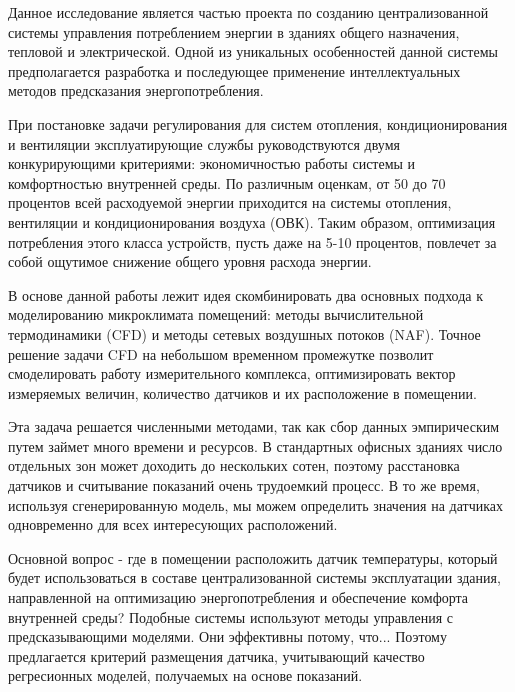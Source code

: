 
Данное исследование является частью проекта по созданию централизованной системы управления потреблением энергии в зданиях общего назначения, тепловой и электрической. Одной из уникальных особенностей данной системы предполагается разработка и последующее применение интеллектуальных методов предсказания энергопотребления.

При постановке задачи регулирования для систем отопления, кондиционирования и вентиляции эксплуатирующие службы руководствуются двумя конкурирующими критериями: экономичностью работы системы и комфортностью внутренней среды. По различным оценкам, от 50 до 70 процентов всей расходуемой энергии приходится на системы отопления, вентиляции и кондиционирования воздуха (ОВК). Таким образом, оптимизация потребления этого класса устройств, пусть даже на 5-10 процентов, повлечет за собой ощутимое снижение общего уровня расхода энергии. 

В основе данной работы лежит идея скомбинировать два основных подхода к моделированию микроклимата помещений: методы вычислительной термодинамики (CFD) и методы сетевых воздушных потоков (NAF). Точное решение задачи CFD на небольшом временном промежутке позволит смоделировать работу измерительного комплекса, оптимизировать вектор измеряемых величин, количество датчиков и их расположение в помещении. 

Эта задача решается численными методами, так как сбор данных эмпирическим путем займет много времени и ресурсов. В стандартных офисных зданиях число отдельных зон может доходить до нескольких сотен, поэтому расстановка датчиков и считывание показаний очень трудоемкий процесс. В то же время, используя сгенерированную модель, мы можем определить значения на датчиках одновременно для всех интересующих расположений.


\newpage


Основной вопрос - где в помещении расположить датчик температуры, который будет использоваться в составе централизованной системы эксплуатации здания, направленной на оптимизацию энергопотребления и обеспечение комфорта внутренней среды? Подобные системы используют методы управления с предсказывающими моделями. Они эффективны потому, что...%
Поэтому предлагается критерий размещения датчика, учитывающий качество регресионных моделей, получаемых на основе показаний. 

